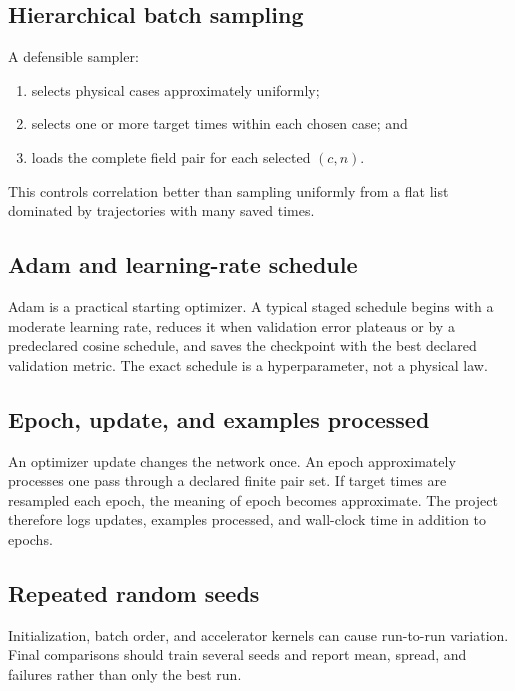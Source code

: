 \documentclass[11pt]{article}
\begin{document}
\subsection{Hierarchical batch sampling}
A defensible sampler:
\begin{enumerate}
  \item selects physical cases approximately uniformly;
  \item selects one or more target times within each chosen case; and
  \item loads the complete field pair for each selected $(c,n)$.
\end{enumerate}
This controls correlation better than sampling uniformly from a flat list dominated by trajectories with many saved times.

\subsection{Adam and learning-rate schedule}
Adam \cite{Kingma2015} is a practical starting optimizer. A typical staged schedule begins with a moderate learning rate, reduces it when validation error plateaus or by a predeclared cosine schedule, and saves the checkpoint with the best declared validation metric. The exact schedule is a hyperparameter, not a physical law.

\subsection{Epoch, update, and examples processed}
An optimizer update changes the network once. An epoch approximately processes one pass through a declared finite pair set. If target times are resampled each epoch, the meaning of epoch becomes approximate. The project therefore logs updates, examples processed, and wall-clock time in addition to epochs.

\subsection{Repeated random seeds}
Initialization, batch order, and accelerator kernels can cause run-to-run variation. Final comparisons should train several seeds and report mean, spread, and failures rather than only the best run.
\end{document}
